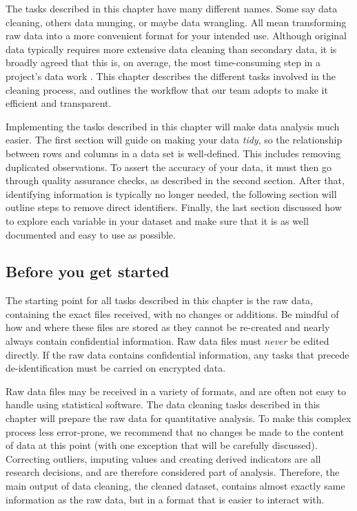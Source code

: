 
\begin{fullwidth}

The tasks described in this chapter have many different names.
Some say data cleaning, others data munging, or maybe data wrangling.
All mean transforming raw data into a more convenient format for your intended use.
Although original data typically requires more extensive data cleaning than secondary data,
it is broadly agreed that this is, on average, the most time-consuming step in a project's data work \citep{dasu2003exploratory}.
This chapter describes the different tasks involved in the cleaning process,
and outlines the workflow that our team adopts to make it efficient and transparent.

Implementing the tasks described in this chapter will make data analysis much easier.
The first section will guide on making your data \textit{tidy},
so the relationship between rows and columns in a data set is well-defined.
This includes removing duplicated observations.
To assert the accuracy of your data, it must then go through quality assurance checks,
as described in the second section.
After that, identifying information is typically no longer needed,
the following section will outline steps to remove direct identifiers.
Finally, the last section discussed how to explore each variable in your dataset and 
make sure that it is as well documented and easy to use as possible.


\end{fullwidth}


\subsection{Before you get started}

The starting point for all tasks described in this chapter is the raw data,
containing the exact files received, with no changes or additions.
Be mindful of how and where these files are stored
as they cannot be re-created and nearly always contain confidential information.
Raw data files must \textit{never} be edited directly.
If the raw data contains confidential information,
any tasks that precede de-identification must be carried on encrypted data.
 
Raw data files may be received in a variety of formats, 
and are often not easy to handle using statistical software.
The data cleaning tasks described in this chapter will prepare the raw data
for quantitative analysis.
To make this complex process less error-prone,
we recommend that no changes be made to the content of data at this point
(with one exception that will be carefully discussed).
Correcting outliers, imputing values and creating derived indicators
are all research decisions, and are therefore considered part of analysis.
Therefore, the main output of data cleaning, the cleaned dataset,
contains almost exactly same information as the raw data,
but in a format that is easier to interact with.  

